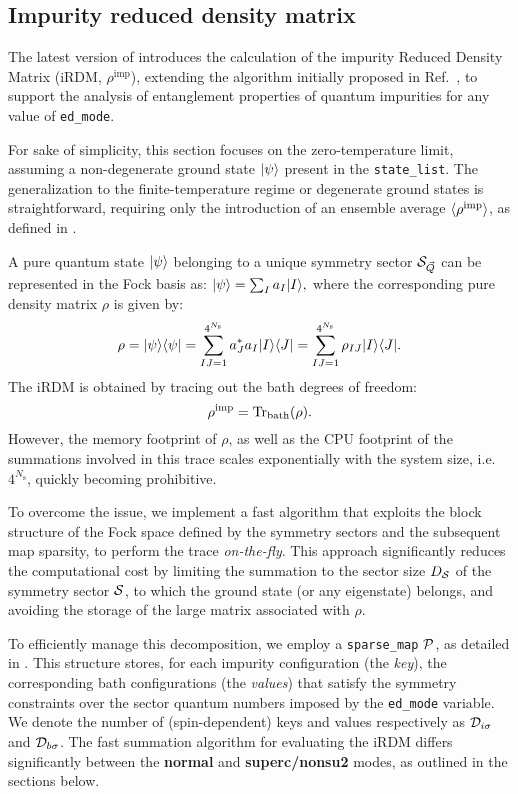 \documentclass[edipack_sp.tex]{subfiles}
\begin{document}
\subsection{Impurity reduced density matrix}\label{sSecRDM}
The latest version of \NAME introduces the calculation of the 
impurity Reduced Density Matrix (iRDM, $\rho^\mathrm{imp}$), 
extending the algorithm initially proposed in 
Ref.~, to support the analysis of entanglement 
properties of quantum impurities for any value of {\tt ed\_mode}.

For sake of simplicity, this section focuses on the zero-temperature limit, 
assuming a non-degenerate ground state $|\psi\rangle$ present in the 
{\tt state\_list}. The generalization to the finite-temperature regime 
or degenerate ground states is straightforward, requiring only the  introduction of an
ensemble average $\langle \rho^\mathrm{imp} \rangle$, as defined in 
.

A pure quantum state $|\psi\rangle$ belonging to a unique symmetry 
sector ${\cal S}_{\vec{Q}}$ can be represented in the Fock basis as:
$
|\psi\rangle = \sum_I a_I |I\rangle,
$
where the corresponding pure density matrix $\rho$ is given by:
\begin{equation}\label{DefRho}
\rho = |\psi\rangle\langle \psi| = \sum_{IJ=1}^{4^{N_\mathrm{s}}} 
a^*_J a_I |I\rangle\langle J| = \sum_{IJ=1}^{4^{N_\mathrm{s}}} 
\rho_{IJ} |I\rangle\langle J|.
\end{equation}
The iRDM is obtained by tracing out the bath degrees of freedom:
\begin{equation}
\rho^\mathrm{imp} = {\rm Tr}_\mathrm{bath}(\rho).
\end{equation}
However, the memory footprint of $\rho$, as well as the CPU footprint 
of the summations involved in this trace scales exponentially 
with the system size, i.e.~$4^{N_\mathrm{s}}$, quickly becoming prohibitive.

To overcome the issue, we implement a fast algorithm that exploits the 
block structure of the Fock space defined by the symmetry sectors and
the subsequent map sparsity, to perform the trace {\it on-the-fly}. 
This approach significantly reduces the computational cost by limiting 
the summation to the sector size $D_{\cal S}$ of the symmetry sector 
${\cal S}$, to which the ground state (or any eigenstate) belongs, and avoiding
the storage of the large matrix associated with $\rho$.

To efficiently manage this decomposition, we employ a 
{\tt sparse\_map} ${\cal P}$, as detailed in . 
This structure stores, for each impurity configuration 
(the {\it key}), the 
corresponding bath configurations 
(the {\it values}) that 
satisfy the symmetry constraints over the sector quantum numbers
imposed by the {\tt ed\_mode} variable.
We denote the number of (spin-dependent) keys and values respectively
as ${\cal D}_{i\sigma}$ and ${\cal D}_{b\sigma}$.
The fast summation algorithm for evaluating the iRDM differs 
significantly between the {\bf normal} and {\bf superc/nonsu2} modes, 
as outlined in the sections below.
\end{document}
